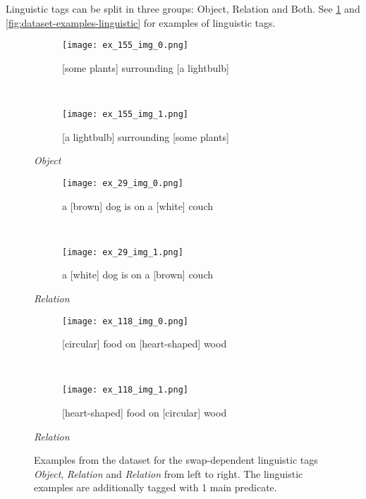 Linguistic tags can be split in three groups: Object, Relation and Both. See \cref{fig:dataset-examples} and \cref{fig:dataset-examples-linguistic} for examples of linguistic tags. 

\begin{figure}[ht]
\centering
    \begin{minipage}[t]{.30\textwidth}
        \begin{subfigure}[t]{\textwidth}
        \centering
        \texttt{[image: ex\_155\_img\_0.png]}
        \caption{[some plants] surrounding [a lightbulb]}
        \end{subfigure}\\
        \begin{subfigure}[t]{\textwidth}
        \centering
        \texttt{[image: ex\_155\_img\_1.png]}
        \caption{[a lightbulb] surrounding [some plants]}
        \end{subfigure}%
        \caption*{\textit{Object}}
    \end{minipage}
    \hfill
    \begin{minipage}[t]{.30\textwidth}
        \begin{subfigure}[t]{\textwidth}
        \centering
        \texttt{[image: ex\_29\_img\_0.png]}
        \caption{a [brown] dog is on a [white] couch}
        \end{subfigure}\\
        \vspace{9pt}
        \begin{subfigure}[t]{\textwidth}
        \centering
        \texttt{[image: ex\_29\_img\_1.png]}
        \caption{a [white] dog is on a [brown] couch}
        \end{subfigure}%
        \caption*{\textit{Relation}}
    \end{minipage}
    \hfill
    \begin{minipage}[t]{.30\textwidth}
        \begin{subfigure}[t]{\textwidth}
        \centering
        \texttt{[image: ex\_118\_img\_0.png]}
        \caption{[circular] food on [heart-shaped] wood}
        \end{subfigure}\\
        \begin{subfigure}[t]{\textwidth}
        \centering
        \texttt{[image: ex\_118\_img\_1.png]}
        \caption{[heart-shaped] food on [circular] wood}
        \end{subfigure}%
        \caption*{\textit{Relation}}
    \end{minipage}%
    \caption{Examples from the dataset for the swap-dependent linguistic tags \textit{Object}, \textit{Relation} and \textit{Relation} from left to right. The linguistic examples are additionally tagged with 1 main predicate.}
    \label{fig:dataset-examples}
\end{figure}

